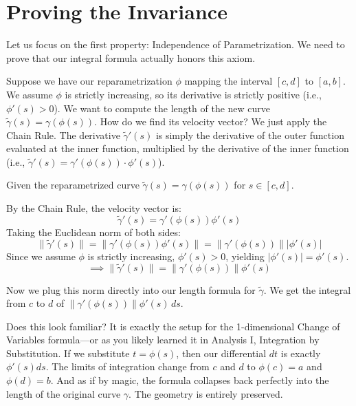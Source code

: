 
\section{Proving the Invariance}

\begin{spoken-clean}[17:30 - 18:45]
Let us focus on the first property: Independence of Parametrization. We need to prove that our integral formula actually honors this axiom. 

Suppose we have our reparametrization $\phi$ mapping the interval $[c, d]$ to $[a, b]$. We assume $\phi$ is strictly increasing, so its derivative is strictly positive (i.e., $\phi'(s) > 0$). We want to compute the length of the new curve $\tilde{\gamma}(s) = \gamma(\phi(s))$. How do we find its velocity vector? We just apply the Chain Rule. The derivative $\tilde{\gamma}'(s)$ is simply the derivative of the outer function evaluated at the inner function, multiplied by the derivative of the inner function (i.e., $\tilde{\gamma}'(s) = \gamma'(\phi(s)) \cdot \phi'(s)$).
\end{spoken-clean}

\begin{math-stroke}
Given the reparametrized curve $\tilde{\gamma}(s) = \gamma(\phi(s))$ for $s \in [c, d]$.

By the Chain Rule, the velocity vector is:
\[
\tilde{\gamma}'(s) = \gamma'(\phi(s)) \phi'(s)
\]
Taking the Euclidean norm of both sides:
\[
\|\tilde{\gamma}'(s)\| = \|\gamma'(\phi(s)) \phi'(s)\| = \|\gamma'(\phi(s))\| |\phi'(s)|
\]
Since we assume $\phi$ is strictly increasing, $\phi'(s) > 0$, yielding $|\phi'(s)| = \phi'(s)$.
\[
\implies \|\tilde{\gamma}'(s)\| = \|\gamma'(\phi(s))\| \phi'(s)
\]
\end{math-stroke}

\begin{spoken-clean}[18:45 - 20:00]
Now we plug this norm directly into our length formula for $\tilde{\gamma}$. We get the integral from $c$ to $d$ of $\|\gamma'(\phi(s))\| \phi'(s) \, ds$. 

Does this look familiar? It is exactly the setup for the 1-dimensional Change of Variables formula—or as you likely learned it in Analysis I, Integration by Substitution. If we substitute $t = \phi(s)$, then our differential $dt$ is exactly $\phi'(s) ds$. The limits of integration change from $c$ and $d$ to $\phi(c)=a$ and $\phi(d)=b$. And as if by magic, the formula collapses back perfectly into the length of the original curve $\gamma$. The geometry is entirely preserved.
\end{spoken-clean}

